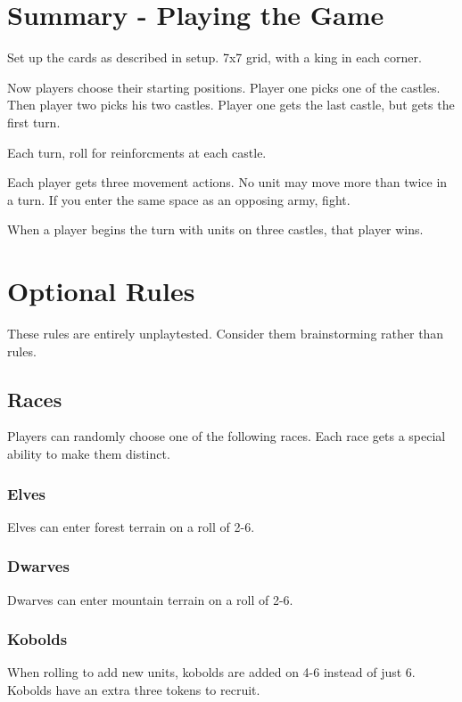 \documentclass{article}
\begin{document}
\section{Summary - Playing the Game}

Set up the cards as described in setup.  7x7 grid, with a king in each corner.

Now players choose their starting positions.  Player one picks one of the castles.  Then player two picks his two castles.  Player one gets the last castle, but gets the first turn.

Each turn, roll for reinforcments at each castle.

Each player gets three movement actions.  No unit may move more than twice in a turn.  If you enter the same space as an opposing army, fight.

When a player begins the turn with units on three castles, that player wins.  

\newpage
\section{Optional Rules}

These rules are entirely unplaytested.  Consider them brainstorming rather than rules.

\subsection{Races}

Players can randomly choose one of the following races.  Each race gets a special ability to make them distinct.

\subsubsection{Elves}

Elves can enter forest terrain on a roll of 2-6.

\subsubsection{Dwarves}

Dwarves can enter mountain terrain on a roll of 2-6.

\subsubsection{Kobolds}

When rolling to add new units, kobolds are added on 4-6 instead of just 6.  Kobolds have an extra three tokens to recruit.
\end{document}
